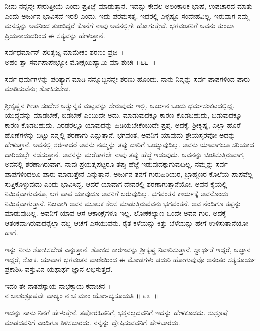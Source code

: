 ನೀನು ನನ್ನನ್ನೇ ಸೇರುತ್ತೀಯೆ ಎಂದು ಪ್ರತಿಜ್ಞೆ ಮಾಡುತ್ತಾನೆ. ಇದನ್ನು ಕೇವಲ ಅಲಂಕಾರಿಕ ಭಾಷೆ, ಉಪಚಾರದ ಮಾತು ಎಂದು ಅರ್ಜುನ ಭಾವಿಸದೆ ಇರಲಿ ಎಂದು. ಇದು ಪರಮಸತ್ಯ. ಇದರಲ್ಲಿ ಎಳ್ಳಷ್ಟೂ ಸಂದೇಹವಿಲ್ಲ. ಇರುವಾಗ ನಮ್ಮ ಮನಸ್ಸನ್ನು ಅವನಿಂದ ತುಂಬಿದ್ದರೆ ಕೊನೆಗೆ ನಾವು ಅವನಲ್ಲಿಗೇ ಹೋಗುತ್ತೇವೆ. ಭಗವಂತನಿಗೆ ಅವನು ತುಂಬಾ ಪ್ರಿಯನಾದುದರಿಂದ ಈ ಸತ್ಯವನ್ನು ಹೇಳುತ್ತಾನೆ.

\begin{shloka}
ಸರ್ವಧರ್ಮಾನ್ ಪರಿತ್ಯಜ್ಯ ಮಾಮೇಕಂ ಶರಣಂ ವ್ರಜ~।\\ಅಹಂ ತ್ವಾ ಸರ್ವಪಾಪೇಭ್ಯೋ ಮೋಕ್ಷಯಿಷ್ಯಾಮಿ ಮಾ ಶುಚಃ \hfill॥೬೬~॥
\end{shloka}

\begin{artha}
ಸರ್ವ ಧರ್ಮಗಳನ್ನು ಪರಿತ್ಯಾಗ ಮಾಡಿ ನನ್ನೊಬ್ಬನನ್ನೇ ಶರಣು ಹೊಂದು. ನಾನು ನಿನ್ನನ್ನು ಸರ್ವ ಪಾಪಗಳಿಂದ ಪಾರು ಮಾಡಿಸುವೆನು; ಶೋಕಿಸಬೇಡ.
\end{artha}

ಶ‍್ರೀಕೃಷ್ಣನ ಗೀತಾ ಸಂದೇಶ ಅತ್ಯುನ್ನತ ಮಟ್ಟವನ್ನು ಸೇರುವುದು ಇಲ್ಲಿ. ಅರ್ಜುನ ಒಂದು ಧರ್ಮಸಂಕಟದಲ್ಲಿದ್ದ. ಯುದ್ಧವನ್ನು ಮಾಡಬೇಕೆ, ಬಿಡಬೇಕೆ ಎಂಬುದೇ ಅದು. ಮಾಡುವುದಕ್ಕೂ ಕಾರಣ ಕೊಡಬಹುದು, ಬಿಡುವುದಕ್ಕೂ ಕಾರಣ ಕೊಡಬಹುದು. ಎರಡರಲ್ಲೂ ಯಾವುದನ್ನು ಹಿಡಿಯಬೇಕೆಂಬುದೇ ಪ್ರಶ್ನೆ. ಅದಕ್ಕೆ, ಶ‍್ರೀಕೃಷ್ಣ, ಎಲ್ಲಾ ಹೊರೆ ಹೊಣೆಗಳನ್ನು ಬಿಟ್ಟು ನನ್ನಲ್ಲಿ ಶರಣಾಗು ಎನ್ನುತ್ತಾನೆ. ಭಗವಂತ, ಅವನಿಗೆ ಯಾವುದು ಶ್ರೇಯಸ್ಕರವೋ ಅದನ್ನು ಹೇಳುತ್ತಾನೆ. ಅವನಲ್ಲಿ ಶರಣಾದರೆ ಅವನು ನಮ್ಮನ್ನು ತಪ್ಪು ದಾರಿಗೆ ಒಯ್ಯುವುದಿಲ್ಲ. ಅವನು ಯಾವಾಗಲೂ ಸರಿಯಾದ ದಾರಿಯಲ್ಲೇ ನಡೆಸುತ್ತಾನೆ. ಅವನನ್ನು ಮರೆತಾಗಲೇ ನಾವು ತಪ್ಪು ಹೆಜ್ಜೆ ಇಡುವುದು. ಅವನನ್ನು ಚಿಂತಿಸುತ್ತಿರುವಾಗ, ಅವನಲ್ಲಿ ಶರಣಾಗಿರುವಾಗ, ನಾವು ಪ್ರಯತ್ನಪಟ್ಟರೂ ತಪ್ಪು ಹೆಜ್ಜೆ ಇಡುವುದಕ್ಕಾಗುವುದಿಲ್ಲ. ನಮ್ಮನ್ನು ಸರ್ವ ಪಾಪಗಳಿಂದಲೂ ಪಾರು ಮಾಡುತ್ತೇನೆ ಎನ್ನುತ್ತಾನೆ. ಅರ್ಜುನ ತನಗೆ ಗುರುಹಿರಿಯರ, ಬ್ರಾಹ್ಮಣರ ಕೊಲೆಯ ಪಾಪವೆಲ್ಲ ಸುತ್ತಿಕೊಳ್ಳುವುದು ಎಂದು ಭಾವಿಸಿದ್ದ. ಆದರೆ ಯಾವಾಗ ದೇವರಲ್ಲಿ ಶರಣಾಗುತ್ತಾನೆಯೋ, ಅವನ ಕೈಯಲ್ಲಿ ನಿಮಿತ್ತವಾಗುವನೊ, ಆಗ ಪಾಪ ಯಾವುದೂ ಅವನಿಗೆ ಬರುವುದಿಲ್ಲ. ಭಗವಂತನ ಕಾರ್ಯಕ್ಕೆ ಅವನೊಂದು ನಿಮಿತ್ತವಾಗುತ್ತಾನೆ. ನಿಜವಾಗಿ ಅವನ ಮೂಲಕ ಕೆಲಸ ಮಾಡುತ್ತಿರುವವನು ಭಗವಂತನೆ. ಅವ ನೆಂದಿಗೂ ತಪ್ಪನ್ನು ಮಾಡುವುದಿಲ್ಲ. ಅವನಿಗೆ ಯಾವ ಆಸೆ ಆಕಾಂಕ್ಷೆಗಳೂ ಇಲ್ಲ. ಲೋಕಕಲ್ಯಾಣ ಒಂದೇ ಅವನ ಗುರಿ. ಅದಕ್ಕೆ ಆತಂಕವಾಗಿರುವುದನ್ನೆಲ್ಲಾ ದಬ್ಬಿ ಆಚೆಗೆ ಎಸೆಯುವನು. ರೈತ ಕಳೆಯನ್ನು ಕಿತ್ತು ಬೆಳೆಯನ್ನು ಹೇಗೆ ಉಳಿಸುತ್ತಾನೆಯೋ ಹಾಗೆ.

ಇನ್ನು ನೀನು ಶೋಕಿಸಬೇಡ ಎನ್ನುತ್ತಾನೆ. ಶೋಕದ ಕಾರಣವನ್ನು ಶ‍್ರೀಕೃಷ್ಣ ನಿವಾರಿಸುತ್ತಾನೆ. ಸ್ವಾರ್ಥತೆ ಇದ್ದರೆ, ಅಜ್ಞಾನ ಇದ್ದರೆ, ಶೋಕ. ಯಾವಾಗ ಭಗವಂತನ ವಾಣಿಯಿಂದ ಈ ಮೋಡಗಳು ಚದುರಿ ಹೋಗುವುವೊ ಅನಂತರ ಸತ್ಯಸೂರ್ಯ ಪ್ರಕಾಶಿಸಿ ವಸ್ತುವಿನ ಯಥಾರ್ಥ ಜ್ಞಾನ ಲಭಿಸುತ್ತದೆ.

\begin{shloka}
ಇದಂ ತೇ ನಾತಪಸ್ಕಾಯ ನಾಭಕ್ತಾಯ ಕದಾಚನ~।\\ನ ಚಾಶುಶ್ರೂಷವೇ ವಾಚ್ಯಂ ನ ಚ ಮಾಂ ಯೋಽಭ್ಯಸೂಯತಿ \hfill॥ ೬೭~॥
\end{shloka}

\begin{artha}
ಇದನ್ನು ನಾನು ನಿನಗೆ ಹೇಳುತ್ತೇನೆ. ತಪೋರಹಿತನಿಗೆ, ಭಕ್ತನಲ್ಲದವನಿಗೆ ಇದನ್ನು ಹೇಳಕೂಡದು. ಶುಶ್ರೂಷೆ ಮಾಡದವನಿಗೆ ಎಂದಿಗೂ ತಿಳಿಸಬಾರದು. ನನ್ನನ್ನು ದ್ವೇಷಿಸುವವನಿಗೆ ಹೇಳಬಾರದು.
\end{artha}

